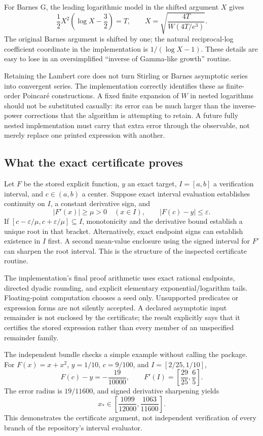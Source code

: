 \documentclass[11pt,a4paper]{article}
\theoremstyle{remark}\newtheorem{remark}[proposition]{Remark}
\begin{document}
For Barnes G, the leading logarithmic model in the shifted argument $X$ gives
\[
 \frac12X^2\left(\log X-\frac32\right)=T,
 \qquad X=\sqrt{\frac{4T}{W(4T/e^3)}}.
\]
The original Barnes argument is shifted by one; the natural reciprocal-log coefficient coordinate in the implementation is $1/(\log X-1)$. These details are easy to lose in an oversimplified ``inverse of Gamma-like growth'' routine.\cite{gamma,dlmf-barnes}

Retaining the Lambert core does not turn Stirling or Barnes asymptotic series into convergent series. The implementation correctly identifies these as finite-order Poincar\'e constructions. A fixed finite expansion of $W$ in nested logarithms should not be substituted casually: its error can be much larger than the inverse-power corrections that the algorithm is attempting to retain. A future fully nested implementation must carry that extra error through the observable, not merely replace one printed expression with another.\cite{gamma,dlmf-gamma,dlmf-barnes}

\subsection{What the exact certificate proves}
Let $F$ be the stored explicit function, $y$ an exact target, $I=[a,b]$ a verification interval, and $c\in(a,b)$ a center. Suppose exact interval evaluation establishes continuity on $I$, a constant derivative sign, and
\[
 |F'(x)|\ge\mu>0\quad(x\in I),\qquad |F(c)-y|\le\varepsilon.
\]
If $[c-\varepsilon/\mu,c+\varepsilon/\mu]\subseteq I$, monotonicity and the derivative bound establish a unique root in that bracket. Alternatively, exact endpoint signs can establish existence in $I$ first. A second mean-value enclosure using the signed interval for $F'$ can sharpen the root interval. This is the structure of the inspected certificate routine.\cite{certificates}

The implementation's final proof arithmetic uses exact rational endpoints, directed dyadic rounding, and explicit elementary exponential/logarithm tails. Floating-point computation chooses a seed only. Unsupported predicates or expression forms are not silently accepted. A declared asymptotic input remainder is not enclosed by the certificate; the result explicitly says that it certifies the stored expression rather than every member of an unspecified remainder family.\cite{certificates}

The independent bundle checks a simple example without calling the package. For $F(x)=x+x^2$, $y=1/10$, $c=9/100$, and $I=[2/25,1/10]$,
\[
 F(c)-y=-\frac{19}{10000},\qquad F'(I)=\left[\frac{29}{25},\frac65\right].
\]
The error radius is $19/11600$, and signed derivative sharpening yields
\[
 x_*\in\left[\frac{1099}{12000},\frac{1063}{11600}\right].
\]
This demonstrates the certificate argument, not independent verification of every branch of the repository's interval evaluator.
\end{document}
